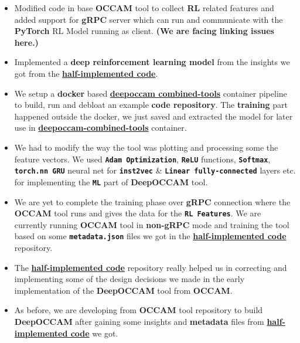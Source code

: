 \documentclass{article} %
\begin{document}
\begin{itemize}
	\item Modified code in base \textbf{OCCAM} tool to collect \textbf{RL} related features and added support for \textbf{gRPC} server which can run and communicate with the \textbf{PyTorch} RL Model running as client. \textbf{\color{red} (We are facing linking issues here.)}
	\item Implemented a \textbf{deep reinforcement learning model} from the insights we got from the \textbf{\href{https://github.com/nhamlv-55/OCCAM/tree/mlpolicy}{half-implemented code}}. 
	\item We setup a \textbf{docker} based \textbf{\href{https://hub.docker.com/r/prodrelworks/deepoccam8}{deepoccam combined-tools}} container pipeline to build, run and debloat an example \textbf{\color{blue} code repository}. The \textbf{training} part happened outside the docker, we just saved and extracted the model for later use in \textbf{\href{https://hub.docker.com/r/prodrelworks/deepoccam8}{deepoccam-combined-tools}} container. 
	\item We had to modify the way the tool was plotting and processing some the feature vectors. We used \textbf{\texttt{Adam Optimization}}, \textbf{\texttt{ReLU}} functions, \textbf{\texttt{Softmax}}, \textbf{\texttt{torch.nn GRU}} neural net for \textbf{\texttt{inst2vec}} \& \textbf{\texttt{Linear fully-connected}} layers etc. for implementing the \textbf{\texttt{ML}} part of \textbf{DeepOCCAM} tool.
	\item We are yet to complete the training phase over \textbf{gRPC} connection where the \textbf{OCCAM} tool runs and gives the data for the \textbf{\texttt{RL Features}}. We are currently running \textbf{OCCAM} tool in \textbf{non-gRPC} mode and training the tool based on some 
	\textbf{\texttt{metadata.json}} files we got in the \textbf{\href{https://github.com/nhamlv-55/OCCAM/tree/mlpolicy}{half-implemented code}} repository. 
	\item The \textbf{\href{https://github.com/nhamlv-55/OCCAM/tree/mlpolicy}{half-implemented code}} repository really helped us in correcting and implementing some of the design decisions we made in the early implementation of the \textbf{DeepOCCAM} tool from \textbf{OCCAM}.
	\item As before, we are developing from \textbf{OCCAM} tool repository to build \textbf{DeepOCCAM} after gaining some insights and \textbf{metadata} files from \textbf{\href{https://github.com/nhamlv-55/OCCAM/tree/mlpolicy}{half-implemented code}} we got. 
\end{itemize}
\end{document}
